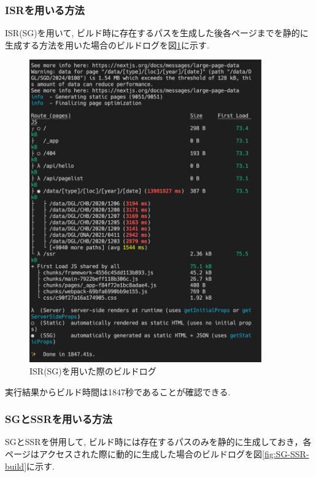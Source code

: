 \subsubsection{ISRを用いる方法}
ISR(SG)を用いて, ビルド時に存在するパスを生成した後各ページまでを静的に生成する方法を用いた場合のビルドログを図\ref{fig:ISR-build}に示す.

\begin{figure}[htbp]
	\begin{center}
		\includegraphics[width=100mm]{./images/ISR-log.png}
		\caption{ISR(SG)を用いた際のビルドログ}\label{fig:ISR-build}
	\end{center}
\end{figure}

実行結果からビルド時間は1847秒であることが確認できる.

\subsubsection{SGとSSRを用いる方法}
SGとSSRを併用して, ビルド時には存在するパスのみを静的に生成しておき，各ページはアクセスされた際に動的に生成した場合のビルドログを図\ref{fig:SG-SSR-build}に示す.

